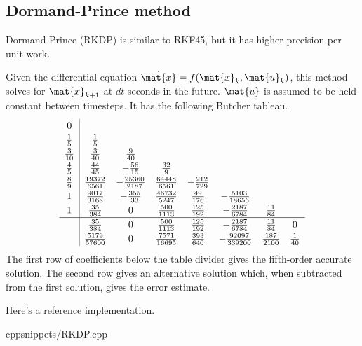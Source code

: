 \subsection{Dormand-Prince method}

Dormand-Prince (RKDP) is similar to RKF45, but it has higher precision per unit
work.
\begin{theorem}
  Given the differential equation $\dot{\mat{x}} = f(\mat{x}_k, \mat{u}_k)$,
  this method solves for $\mat{x}_{k+1}$ at $dt$ seconds in the future.
  $\mat{u}$ is assumed to be held constant between timesteps. It has the
  following Butcher tableau.
  \begin{equation*}
    \renewcommand\arraystretch{1.2}
    \begin{array}{c|ccccccc}
      0 \\
      \frac{1}{5} & \frac{1}{5} \\
      \frac{3}{10} & \frac{3}{40} & \frac{9}{40} \\
      \frac{4}{5} & \frac{44}{45} & -\frac{56}{15} & \frac{32}{9} \\
      \frac{8}{9} & \frac{19372}{6561} & -\frac{25360}{2187} &
        \frac{64448}{6561} & -\frac{212}{729} \\
      1 & \frac{9017}{3168} & -\frac{355}{33} & \frac{46732}{5247} &
        \frac{49}{176} & -\frac{5103}{18656} \\
      1 & \frac{35}{384} & 0 & \frac{500}{1113} & \frac{125}{192} &
        -\frac{2187}{6784} & \frac{11}{84} \\
      \hline
      & \frac{35}{384} & 0 & \frac{500}{1113} & \frac{125}{192} &
        -\frac{2187}{6784} & \frac{11}{84} & 0 \\
      & \frac{5179}{57600} & 0 & \frac{7571}{16695} & \frac{393}{640} &
        -\frac{92097}{339200} & \frac{187}{2100} & \frac{1}{40}
    \end{array}
  \end{equation*}
  The first row of coefficients below the table divider gives the fifth-order
  accurate solution. The second row gives an alternative solution which,
  when subtracted from the first solution, gives the error estimate.
\end{theorem}

Here's a reference implementation.
\begin{coderemote}{cpp}{snippets/RKDP.cpp}
  \caption{RKDP implementation in C++}
\end{coderemote}
